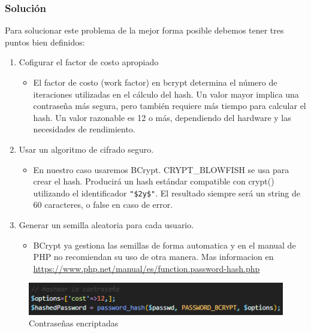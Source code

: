 \documentclass{report}
\begin{document}
                \subsubsection{Solución}
                    Para solucionar este problema de la mejor forma posible debemos tener tres puntos bien definidos:
                    \begin{enumerate}
                        \item Cofigurar el factor de costo apropiado
                        \begin{itemize}
                            \item El factor de costo (work factor) en bcrypt determina el número de iteraciones utilizadas en el cálculo del hash. Un valor mayor implica una contraseña más segura, pero también requiere más tiempo para calcular el hash. Un valor razonable es 12 o más, dependiendo del hardware y las necesidades de rendimiento.
                        \end{itemize}
                        \item Usar un algoritmo de cifrado seguro.
                        \begin{itemize}
                            \item En nuestro caso usaremos BCrypt. CRYPT\_BLOWFISH se usa para crear el hash. Producirá un hash estándar compatible con crypt() utilizando el identificador \texttt{"\$2y\$"}. El resultado siempre será un string de 60 caracteres, o false en caso de error.
                        \end{itemize}
                        \item Generar un semilla aleatoria para cada usuario.
                        \begin{itemize}
                            \item BCrypt ya gestiona las semillas de forma automatica y en el manual de PHP no recomiendan su uso de otra manera. Mas informacion en \url{https://www.php.net/manual/es/function.password-hash.php}
                        \end{itemize}
                    \end{enumerate}
                    \begin{figure}[H]
                        \centering
                        \includegraphics[width=\textwidth]{./img/vulnerabilidades/3.2/2.2.png}
                        \caption{Contraseñas encriptadas}
                    \end{figure}
            \clearpage
\end{document}
